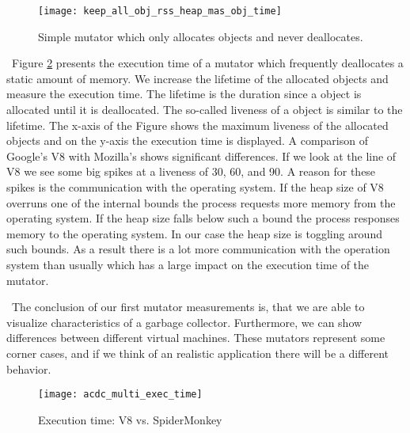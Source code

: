 \begin{figure}
	\centering
	\texttt{[image: keep\_all\_obj\_rss\_heap\_mas\_obj\_time]}
	\caption{Simple mutator which only allocates objects and never deallocates.}
	\label{fig:mutator_keep_all_obj}
\end{figure}

\
Figure \ref{fig:acdc_multi_exec_time} presents the execution time of a mutator which frequently deallocates a static amount of memory. We increase the lifetime of the allocated objects and measure the execution time. The lifetime is the duration since a object is allocated until it is deallocated. The so-called liveness of a object is similar to the lifetime. The x-axis of the Figure shows the maximum liveness of the allocated objects and on the y-axis the execution time is displayed. A comparison of Google's V8 with Mozilla's \SM shows significant differences. If we look at the line of V8 we see some big spikes at a liveness of 30, 60, and 90. A reason for these spikes is the communication with the operating system. If the heap size of V8 overruns one of the internal bounds the process requests more memory from the operating system. If the heap size falls below such a bound the process responses memory to the operating system. In our case the heap size is toggling around such bounds. As a result there is a lot more communication with the operation system than usually which has a large impact on the execution time of the mutator.

\
The conclusion of our first mutator measurements is, that we are able to visualize characteristics of a garbage collector. Furthermore, we can show differences between different virtual machines. These mutators represent some corner cases, and if we think of an realistic \JS application there will be a different behavior.

\begin{figure}
	\centering
	\texttt{[image: acdc\_multi\_exec\_time]}
	\caption{Execution time: V8 vs. SpiderMonkey}
	\label{fig:acdc_multi_exec_time}
\end{figure}




